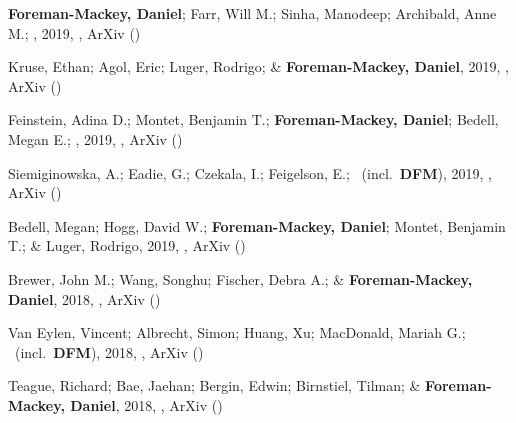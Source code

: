 \item[{\color{numcolor}\scriptsize30}] \textbf{Foreman-Mackey, Daniel}; Farr, Will M.; Sinha, Manodeep; Archibald, Anne M.; \etal, 2019, , ArXiv ()

\item[{\color{numcolor}\scriptsize29}] Kruse, Ethan; Agol, Eric; Luger, Rodrigo; \& \textbf{Foreman-Mackey, Daniel}, 2019, , ArXiv ()

\item[{\color{numcolor}\scriptsize28}] Feinstein, Adina D.; Montet, Benjamin T.; \textbf{Foreman-Mackey, Daniel}; Bedell, Megan E.; \etal, 2019, , ArXiv ()

\item[{\color{numcolor}\scriptsize27}] Siemiginowska, A.; Eadie, G.; Czekala, I.; Feigelson, E.; \etal\ (incl.\ \textbf{DFM}), 2019, , ArXiv ()

\item[{\color{numcolor}\scriptsize26}] Bedell, Megan; Hogg, David W.; \textbf{Foreman-Mackey, Daniel}; Montet, Benjamin T.; \& Luger, Rodrigo, 2019, , ArXiv ()

\item[{\color{numcolor}\scriptsize25}] Brewer, John M.; Wang, Songhu; Fischer, Debra A.; \& \textbf{Foreman-Mackey, Daniel}, 2018, , ArXiv ()

\item[{\color{numcolor}\scriptsize24}] Van Eylen, Vincent; Albrecht, Simon; Huang, Xu; MacDonald, Mariah G.; \etal\ (incl.\ \textbf{DFM}), 2018, , ArXiv ()

\item[{\color{numcolor}\scriptsize23}] Teague, Richard; Bae, Jaehan; Bergin, Edwin; Birnstiel, Tilman; \& \textbf{Foreman-Mackey, Daniel}, 2018, , ArXiv ()


